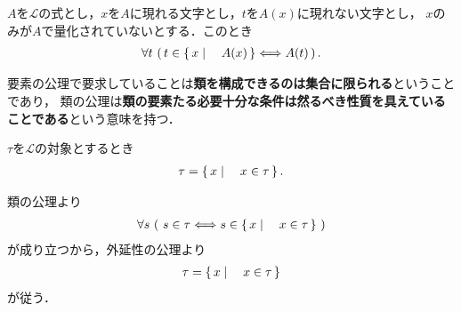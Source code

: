 	\begin{screen}
		\begin{axm}[類の公理] 
			$A$を$\mathcal{L}$の式とし，$x$を$A$に現れる文字とし，$t$を$A(x)$に現れない文字とし，
			$x$のみが$A$で量化されていないとする．このとき
			\begin{align}
				\forall t\, \left(\, t \in \left\{\, x \mid \quad A(x)\, \right\} \Longleftrightarrow A(t)\, \right).
			\end{align}
		\end{axm}
	\end{screen}
	
	要素の公理で要求していることは{\bf 類を構成できるのは集合に限られる}ということであり，
	類の公理は{\bf 類の要素たる必要十分な条件は然るべき性質を具えていることである}という意味を持つ．
	
	\begin{screen}
		\begin{thm}
			$\tau$を$\mathcal{L}$の対象とするとき
			\begin{align}
				\tau = \left\{\, x \mid \quad x \in \tau\, \right\}.
			\end{align}
		\end{thm}
	\end{screen}
	
	\begin{prf}
		類の公理より
		\begin{align}
			\forall s\ (\ s \in \tau \Longleftrightarrow s \in \left\{\, x \mid \quad x \in \tau\, \right\}\ )
		\end{align}
		が成り立つから，外延性の公理より
		\begin{align}
			\tau = \left\{\, x \mid \quad x \in \tau\, \right\}
		\end{align}
		が従う．
		\QED
	\end{prf}
	
	
